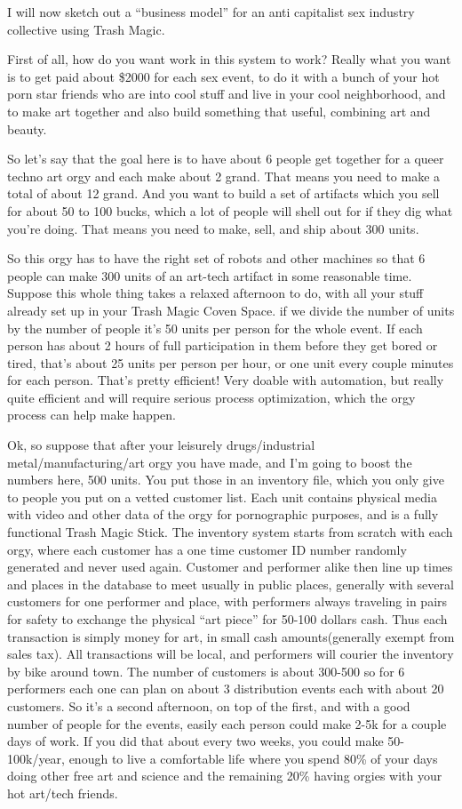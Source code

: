I will now sketch out a ``business model'' for an anti capitalist sex
industry collective using Trash Magic.

First of all, how do you want work in this system to work? Really what
you want is to get paid about \$2000 for each sex event, to do it with a
bunch of your hot porn star friends who are into cool stuff and live in
your cool neighborhood, and to make art together and also build
something that useful, combining art and beauty.

So let's say that the goal here is to have about 6 people get together
for a queer techno art orgy and each make about 2 grand. That means you
need to make a total of about 12 grand. And you want to build a set of
artifacts which you sell for about 50 to 100 bucks, which a lot of
people will shell out for if they dig what you're doing. That means you
need to make, sell, and ship about 300 units.

So this orgy has to have the right set of robots and other machines so
that 6 people can make 300 units of an art-tech artifact in some
reasonable time. Suppose this whole thing takes a relaxed afternoon to
do, with all your stuff already set up in your Trash Magic Coven Space.
if we divide the number of units by the number of people it's 50 units
per person for the whole event. If each person has about 2 hours of full
participation in them before they get bored or tired, that's about 25
units per person per hour, or one unit every couple minutes for each
person. That's pretty efficient! Very doable with automation, but really
quite efficient and will require serious process optimization, which the
orgy process can help make happen.

Ok, so suppose that after your leisurely drugs/industrial
metal/manufacturing/art orgy you have made, and I'm going to boost the
numbers here, 500 units. You put those in an inventory file, which you
only give to people you put on a vetted customer list. Each unit
contains physical media with video and other data of the orgy for
pornographic purposes, and is a fully functional Trash Magic Stick. The
inventory system starts from scratch with each orgy, where each customer
has a one time customer ID number randomly generated and never used
again. Customer and performer alike then line up times and places in the
database to meet usually in public places, generally with several
customers for one performer and place, with performers always traveling
in pairs for safety to exchange the physical ``art piece'' for 50-100
dollars cash. Thus each transaction is simply money for art, in small
cash amounts(generally exempt from sales tax). All transactions will be
local, and performers will courier the inventory by bike around town.
The number of customers is about 300-500 so for 6 performers each one
can plan on about 3 distribution events each with about 20 customers. So
it's a second afternoon, on top of the first, and with a good number of
people for the events, easily each person could make 2-5k for a couple
days of work. If you did that about every two weeks, you could make
50-100k/year, enough to live a comfortable life where you spend 80\% of
your days doing other free art and science and the remaining 20\% having
orgies with your hot art/tech friends.

